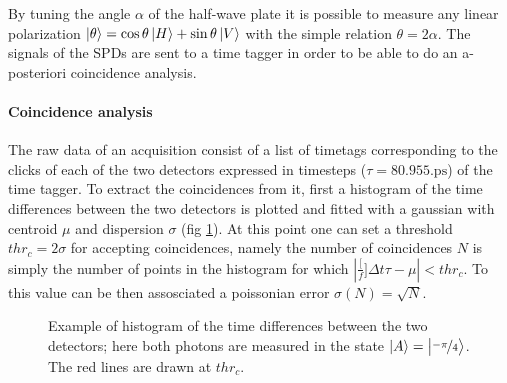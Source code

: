 \documentclass[a4paper, 11pt]{article}
\begin{document}
  By tuning the angle $\alpha$ of the half-wave plate it is possible to measure any linear polarization $\ket{\theta} = \cos{\theta}\ket{H} + \sin{\theta}\ket{V}$ with the simple relation $\theta = 2\alpha$.
  The signals of the SPDs are sent to a time tagger in order to be able to do an a-posteriori coincidence analysis.

  \paragraph{Coincidence analysis}
  The raw data of an acquisition consist of a list of timetags corresponding to the clicks of each of the two detectors expressed in timesteps ($\tau = 80.955\si{.\pico\second}$) of the time tagger. To extract the coincidences from it, first a histogram of the time differences between the two detectors is plotted and fitted with a gaussian with centroid $\mu$ and dispersion $\sigma$ (fig \ref{fig:hist}). At this point one can set a threshold $thr_{c} = 2\sigma$ for accepting coincidences, namely the number of coincidences $N$ is simply the number of points in the histogram for which $|\frac[f]{\Delta t}{\tau} - \mu| < thr_{c}$. To this value can be then assosciated a poissonian error $\sigma(N) = \sqrt{N}$.

  \begin{figure}[H]
    \centering
    \caption{Example of histogram of the time differences between the two detectors; here both photons are measured in the state $\ket{A} = \ket{\frac[f]{-\pi}{4}}$. The red lines are drawn at $thr_c$.}
    \label{fig:hist}
  \end{figure}
\end{document}
